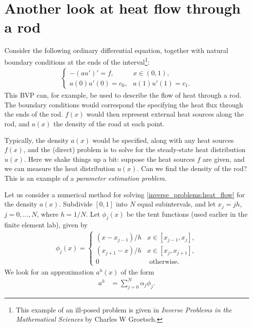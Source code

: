 \section*{Another look at heat flow through a rod}
Consider the following ordinary differential equation, together with natural boundary conditions at the ends of the interval\footnote{This example of an ill-posed problem is given in  \textit{Inverse Problems in the Mathematical Sciences} by Charles W Groetsch.}:
\begin{align}
\begin{cases}
	-(au')' = f, & x \in (0,1),\\
	a(0)u'(0) = c_0, & a(1)u'(1) = c_1.
\end{cases} \label{inverse_problems:heat_flow}
\end{align}
This BVP can, for example, be used to describe the flow of heat through a rod. The boundary conditions would correspond the specifying the heat flux through the ends of the rod. $f(x)$ would then represent external heat sources along the rod, and $a(x)$ the density of the road at each point. 

Typically, the density $a(x)$ would be specified, along with any heat sources $f(x)$, and the (direct) problem is to solve for the steady-state heat distribution $u(x)$. Here we shake things up a bit: suppose the heat sources $f$ are given, and we can measure the heat distribution $u(x)$. Can we find the density of the rod? This is an example of a \textit{parameter estimation problem}.

Let us consider a numerical method for solving \eqref{inverse_problems:heat_flow} for the density $a(x)$.
Subdivide $[0,1]$ into $N$ equal subintervals, and let $x_j = jh$, $j = 0, \ldots,N$, where $h = 1/N$.
Let $\phi_j(x)$ be the tent functions (used earlier in the finite element lab), given by 
\begin{align*}
	\phi_j(x) = \begin{cases}
(x - x_{j-1})/h  &  x \in [x_{j-1},x_j],\\
 (x_{j+1} - x)/h  &  x \in [x_{j},x_{j+1}],\\
0 & \text{ otherwise.}
\end{cases}
\end{align*}
We look for an approximation $a^h(x)$ of the form 
\begin{align}
	a^h &= \sum_{j=0}^N \alpha_j \phi_j. \label{inverse_problems:approximate}
\end{align}

